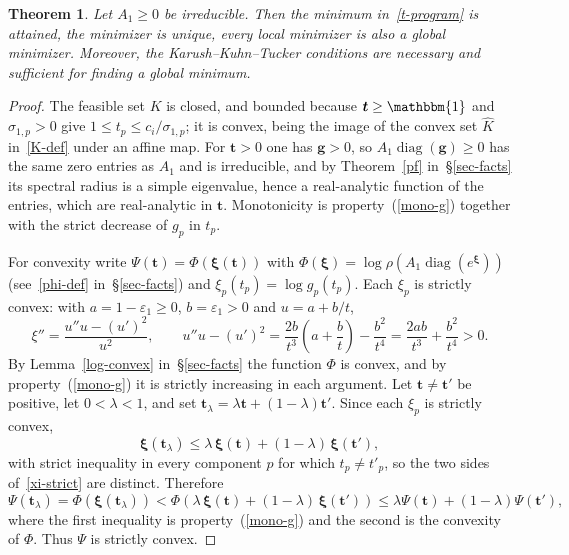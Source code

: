 \documentclass[11pt]{article}
\theoremstyle{plain}
\newtheorem{theorem}{Theorem}[section]
\theoremstyle{definition}
\theoremstyle{remark}
\numberwithin{equation}{section}
\numberwithin{figure}{section}
\numberwithin{table}{section}
\begin{document}
\begin{theorem}\label{global}
Let $A_1\ge 0$ be irreducible. Then
the minimum in~\eqref{t-program} is attained, the minimizer is unique, every
local minimizer is also a global minimizer. Moreover, the Karush--Kuhn--Tucker
conditions are necessary and sufficient for finding a global minimum.
\end{theorem}
\begin{proof}
The feasible set $K$ is closed, and bounded because $\bm t\ge\mathbbm{1}$ and
$\sigma_{1,p}>0$ give $1\le t_p\le c_i/\sigma_{1,p}$; it is convex, being the
image of the convex set $\widehat K$ in~\eqref{K-def} under an affine map. For $\bm t>0$ one has $\bm g>0$, so
$A_1\operatorname{diag}(\bm g)\ge 0$ has the same zero entries as $A_1$ and is
irreducible, and by Theorem~\ref{pf} in~\S\ref{sec-facts} its spectral radius is a
simple eigenvalue, hence a real-analytic function of the entries, which are
real-analytic in $\bm t$. Monotonicity is property~(\ref{mono-g}) together with the
strict decrease of $g_p$ in $t_p$.

For convexity write $\Psi(\bm t)=\Phi\left(\bm\xi(\bm t)\right)$ with
$\Phi(\bm\xi)=\log\rho\left(A_1\operatorname{diag}\left(e^{\bm\xi}\right)\right)$
(see~\eqref{phi-def} in~\S\ref{sec-facts}) and $\xi_p(t_p)=\log g_p(t_p)$. Each $\xi_p$ is strictly convex: with
$a=1-\varepsilon_1\ge 0$, $b=\varepsilon_1>0$ and $u=a+b/t$,
\begin{equation}
\xi''=\frac{u''u-\left(u'\right)^2}{u^2},\qquad
u''u-\left(u'\right)^2=\frac{2b}{t^3}\left(a+\frac{b}{t}\right)-\frac{b^2}{t^4}
=\frac{2ab}{t^3}+\frac{b^2}{t^4}>0 .
\end{equation}
By Lemma~\ref{log-convex} in~\S\ref{sec-facts} the function $\Phi$ is convex, and by
property~(\ref{mono-g}) it is strictly increasing in each argument. Let
$\bm t\neq\bm t'$ be positive, let $0<\lambda<1$, and set
$\bm t_\lambda=\lambda\bm t+(1-\lambda)\bm t'$. Since each $\xi_p$ is strictly
convex,
\begin{equation}\label{xi-strict}
\bm\xi\left(\bm t_\lambda\right)\le\lambda\,\bm\xi(\bm t)+(1-\lambda)\,\bm\xi(\bm t'),
\end{equation}
with strict inequality in every component $p$ for which $t_p\neq t'_p$, so the
two sides of~\eqref{xi-strict} are distinct. Therefore
\begin{equation}\label{psi-strict}
\Psi\left(\bm t_\lambda\right)=\Phi\left(\bm\xi\left(\bm t_\lambda\right)\right)
<\Phi\left(\lambda\,\bm\xi(\bm t)+(1-\lambda)\,\bm\xi(\bm t')\right)
\le\lambda\Psi(\bm t)+(1-\lambda)\Psi(\bm t'),
\end{equation}
where the first inequality is property~(\ref{mono-g}) and the second is the
convexity of $\Phi$. Thus $\Psi$ is strictly convex.


\end{proof}
\end{document}
